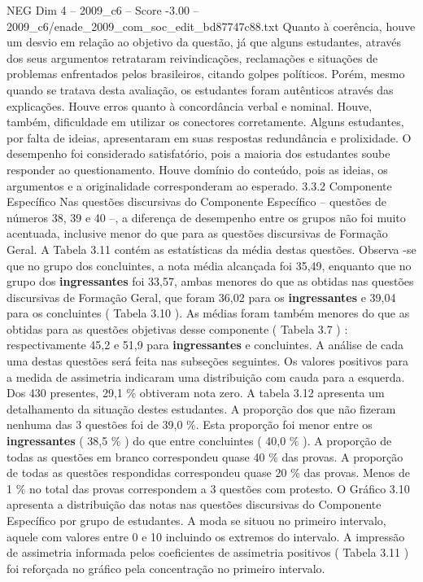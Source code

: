 \begin{textsample}{NEG Dim 4 – 2009\_c6 – Score -3.00 – 2009\_c6/enade\_2009\_com\_soc\_edit\_bd87747c88.txt}
Quanto à coerência, houve um desvio em relação ao objetivo da questão, já que alguns estudantes, através dos seus argumentos retrataram reivindicações, reclamações e situações de problemas enfrentados pelos brasileiros, citando golpes políticos.
Porém, mesmo quando se tratava desta avaliação, os estudantes foram autênticos através das explicações.
Houve erros quanto à concordância verbal e nominal.
Houve, também, dificuldade em utilizar os conectores corretamente.
Alguns estudantes, por falta de ideias, apresentaram em suas respostas redundância e prolixidade.
O desempenho foi considerado satisfatório, pois a maioria dos estudantes soube responder ao questionamento.
Houve domínio do conteúdo, pois as ideias, os argumentos e a originalidade corresponderam ao esperado. 3.3.2 Componente Específico Nas questões discursivas do Componente Específico – questões de números 38, 39 e 40 –, a diferença de desempenho entre os grupos não foi muito acentuada, inclusive menor do que para as questões discursivas de Formação Geral.
A Tabela 3.11 contém as estatísticas da média destas questões.
Observa -se que no grupo dos concluintes, a nota média alcançada foi 35,49, enquanto que no grupo dos \textbf{ingressantes} foi 33,57, ambas menores do que as obtidas nas questões discursivas de Formação Geral, que foram 36,02 para os \textbf{ingressantes} e 39,04 para os concluintes ( Tabela 3.10 ).
As médias foram também menores do que as obtidas para as questões objetivas desse componente ( Tabela 3.7 ) : respectivamente 45,2 e 51,9 para \textbf{ingressantes} e concluintes.
A análise de cada uma destas questões será feita nas subseções seguintes.
Os valores positivos para a medida de assimetria indicaram uma distribuição com cauda para a esquerda.
Dos 430 presentes, 29,1 \% obtiveram nota zero.
A tabela 3.12 apresenta um detalhamento da situação destes estudantes.
A proporção dos que não fizeram nenhuma das 3 questões foi de 39,0 \%.
Esta proporção foi menor entre os \textbf{ingressantes} ( 38,5 \% ) do que entre concluintes ( 40,0 \% ).
A proporção de todas as questões em branco correspondeu quase 40 \% das provas.
A proporção de todas as questões respondidas correspondeu quase 20 \% das provas.
Menos de 1 \% no total das provas correspondem a 3 questões com protesto.
O Gráfico 3.10 apresenta a distribuição das notas nas questões discursivas do Componente Específico por grupo de estudantes.
A moda se situou no primeiro intervalo, aquele com valores entre 0 e 10 incluindo os extremos do intervalo.
A impressão de assimetria informada pelos coeficientes de assimetria positivos ( Tabela 3.11 ) foi reforçada no gráfico pela concentração no primeiro intervalo.

\end{textsample}
